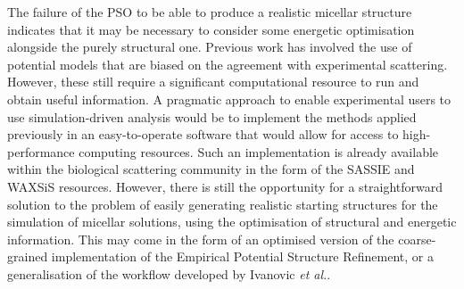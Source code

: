 The failure of the PSO to be able to produce a realistic micellar structure indicates that it may be necessary to consider some energetic optimisation alongside the purely structural one.
Previous work has involved the use of potential models that are biased on the agreement with experimental scattering.\autocite{hargreaves_atomistic_2011,soper_coarse-grained_2017,ivanovic_temperature-dependent_2018}
However, these still require a significant computational resource to run and obtain useful information.
A pragmatic approach to enable experimental users to use simulation-driven analysis would be to implement the methods applied previously in an easy-to-operate software that would allow for access to high-performance computing resources.
Such an implementation is already available within the biological scattering community in the form of the SASSIE\autocite{perkins_atomistic_2016} and WAXSiS\autocite{knight_waxsis_2015} resources.
However, there is still the opportunity for a straightforward solution to the problem of easily generating realistic starting structures for the simulation of micellar solutions, using the optimisation of structural and energetic information.
This may come in the form of an optimised version of the coarse-grained implementation of the Empirical Potential Structure Refinement,\autocite{soper_coarse-grained_2017} or a generalisation of the workflow developed by Ivanovic \emph{et al.}.\autocite{ivanovic_temperature-dependent_2018}


